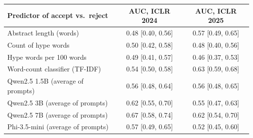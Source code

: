 \begin{tabular}{lcc}
\toprule
\textbf{Predictor of accept vs.\ reject} & \textbf{AUC, ICLR 2024} & \textbf{AUC, ICLR 2025} \\
\midrule
Abstract length (words) & 0.48 {\scriptsize[0.40, 0.56]} & 0.57 {\scriptsize[0.49, 0.65]} \\
Count of hype words & 0.50 {\scriptsize[0.42, 0.58]} & 0.48 {\scriptsize[0.40, 0.56]} \\
Hype words per 100 words & 0.49 {\scriptsize[0.41, 0.57]} & 0.46 {\scriptsize[0.37, 0.53]} \\
Word-count classifier (TF-IDF) & 0.54 {\scriptsize[0.50, 0.58]} & 0.63 {\scriptsize[0.59, 0.68]} \\
\midrule
Qwen2.5 1.5B (average of prompts) & 0.56 {\scriptsize[0.48, 0.64]} & 0.56 {\scriptsize[0.48, 0.65]} \\
Qwen2.5 3B (average of prompts) & 0.62 {\scriptsize[0.55, 0.70]} & 0.55 {\scriptsize[0.47, 0.63]} \\
Qwen2.5 7B (average of prompts) & 0.67 {\scriptsize[0.58, 0.74]} & 0.62 {\scriptsize[0.54, 0.70]} \\
Phi-3.5-mini (average of prompts) & 0.57 {\scriptsize[0.49, 0.65]} & 0.52 {\scriptsize[0.45, 0.60]} \\
\bottomrule
\end{tabular}
